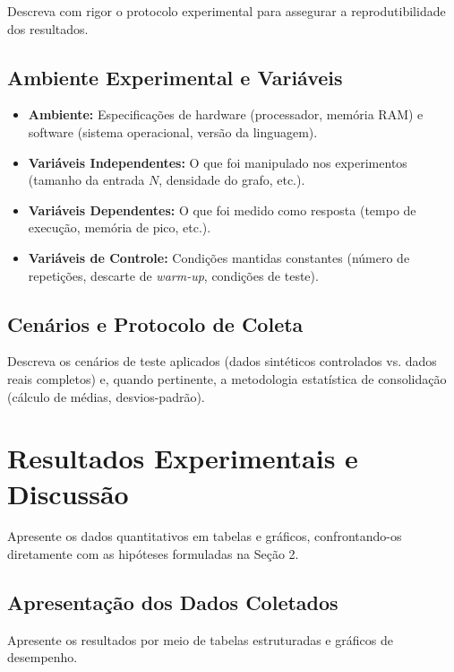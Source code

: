 \documentclass[11pt,a4paper]{article}
\begin{document}
\begin{instrucao}
Descreva com rigor o protocolo experimental para assegurar a reprodutibilidade dos resultados.
\end{instrucao}

\subsection{Ambiente Experimental e Variáveis}
\begin{itemize}
    \item \textbf{Ambiente:} Especificações de hardware (processador, memória RAM) e software (sistema operacional, versão da linguagem).
    \item \textbf{Variáveis Independentes:} O que foi manipulado nos experimentos (tamanho da entrada $N$, densidade do grafo, etc.).
    \item \textbf{Variáveis Dependentes:} O que foi medido como resposta (tempo de execução, memória de pico, etc.).
    \item \textbf{Variáveis de Controle:} Condições mantidas constantes (número de repetições, descarte de \textit{warm-up}, condições de teste).
\end{itemize}

\subsection{Cenários e Protocolo de Coleta}
Descreva os cenários de teste aplicados (dados sintéticos controlados vs. dados reais completos) e, quando pertinente, a metodologia estatística de consolidação (cálculo de médias, desvios-padrão).

\section{Resultados Experimentais e Discussão}

\begin{instrucao}
Apresente os dados quantitativos em tabelas e gráficos, confrontando-os diretamente com as hipóteses formuladas na Seção 2.
\end{instrucao}

\subsection{Apresentação dos Dados Coletados}
Apresente os resultados por meio de tabelas estruturadas e gráficos de desempenho.
\end{document}
